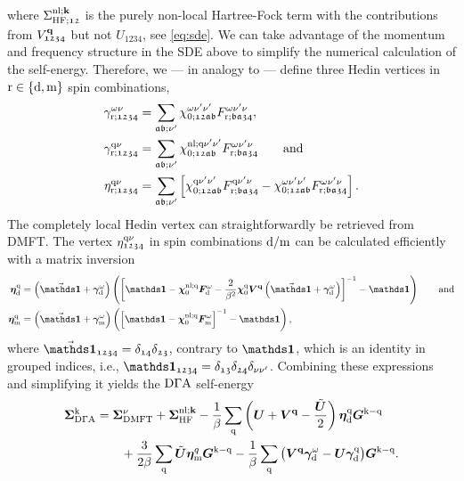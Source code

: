 \documentclass[../../main.tex]{subfiles}
\begin{document}
where $\Sigma_{\text{HF};\mathfrak{12}}^{\text{nl};\textbf{k}}$ is the purely non-local Hartree-Fock term with the contributions from $V^{\textbf{q}}_{\mathfrak{1234}}$ but not $U_{\mathfrak{1234}}$, see \eqref{eq:sde}. We can take advantage of the momentum and frequency structure in the SDE above to simplify the numerical calculation of the self-energy. Therefore, we --- in analogy to \cite{ab initio dga} --- define three Hedin vertices in $\text{r}\in\{\text{d},\text{m}\}$ spin combinations,
\begin{align}\label{eq:three_leg_vertices_abinitio_dga}
	\gamma_{\text{r};\mathfrak{1234}}^{\omega\nu}&=\sum_{\mathfrak{ab;\nu'}}\chi_{0;\mathfrak{12ab}}^{\omega\nu'\nu'}F_{\text{r};\mathfrak{ba34}}^{\omega\nu'\nu},\\
	\gamma_{\text{r};\mathfrak{1234}}^{\text{q}\nu}&=\sum_{\mathfrak{ab;\nu'}}\chi_{0;\mathfrak{12ab}}^{\text{nl};\text{q}\nu'\nu'}F_{\text{r};\mathfrak{ba34}}^{\omega\nu'\nu}\qquad\text{and}\\
	\eta_{\text{r};\mathfrak{1234}}^{\text{q}\nu}&=\sum_{\mathfrak{ab;\nu'}}\left [\chi_{0;\mathfrak{12ab}}^{\text{q}\nu'\nu'}F_{\text{r};\mathfrak{ba34}}^{\text{q}\nu'\nu}-\chi_{0;\mathfrak{12ab}}^{\omega\nu'\nu'}F_{\text{r};\mathfrak{ba34}}^{\omega\nu'\nu}\right ].
\end{align}
The completely local Hedin vertex can straightforwardly be retrieved from DMFT. The vertex $\eta_{\mathfrak{1234}}^{\text{q}\nu}$ in spin combinations $\text{d}/\text{m}$ can be calculated efficiently with a matrix inversion
\begin{subequations}
\begin{align}
	\bm\eta_{\dens}^{\q}&=\left (\vec{\bm\unity}+\bm\gamma_{\dens}^{\omega}\right )\left (\left [\bm\unity-\bm\chi_{0}^{\nl;\q}\bm F_{\dens}^{\omega}-\frac{2}{\beta^2}\bm\chi_{0}^{\q}\bm V^{\vv{q}}\left (\vec{\bm\unity}+\bm\gamma_{\dens}^{\omega}\right )\right ]^{-1}-\bm\unity\right )\qqand\\
	\bm\eta_{\magn}^{\q}&=\left (\vec{\bm\unity}+\bm\gamma_{\magn}^{\omega}\right )\left (\left [\bm\unity-\bm\chi_{0}^{\nl;\q}\bm F_{\magn}^{\omega}\right ]^{-1}-\bm\unity\right ),
\end{align}
\end{subequations}
where $\vec{\bm\unity}_{\mathfrak{1234}}=\delta_{\mathfrak{14}}\delta_{\mathfrak{23}}$, contrary to $\bm\unity$, which is an identity in grouped indices, i.e., $\bm\unity_{\mathfrak{1234}}=\delta_{\mathfrak{13}}\delta_{\mathfrak{24}}\delta_{\nu\nu'}$. Combining these expressions and simplifying it \cite{ab initio dga} yields the $\text{D}\Gamma\text{A}$ self-energy
\begin{align}\label{eq:sde_abinitio_dga}
\begin{split}
	\bm\Sigma_{\text{D}\Gamma\text{A}}^{\text{k}}&=\bm\Sigma_{\text{DMFT}}^{\nu}+\bm\Sigma_{\text{HF}}^{\text{nl};\textbf{k}}-\frac1\beta\sum_{\text{q}}\left (\bm U + \bm V^{\textbf{q}}-\frac{\tilde{\bm U}}{2}\right )\bm\eta_{\text{d}}^{\text{q}}\bm G^{\text{k}-\text{q}}\\
	&\qquad+\frac{3}{2\beta}\sum_{\text{q}}\tilde{\bm U}\bm\eta_{\text{m}}^{q}\bm G^{\text{k}-\text{q}}-\frac1\beta\sum_{\text{q}}\big (\bm V^{\textbf{q}}\bm\gamma_{\text{d}}^{\omega}-\bm U\bm\gamma_{\text{d}}^{\text{q}}\big )\bm G^{\text{k}-\text{q}}.
\end{split}
\end{align}
\end{document}
